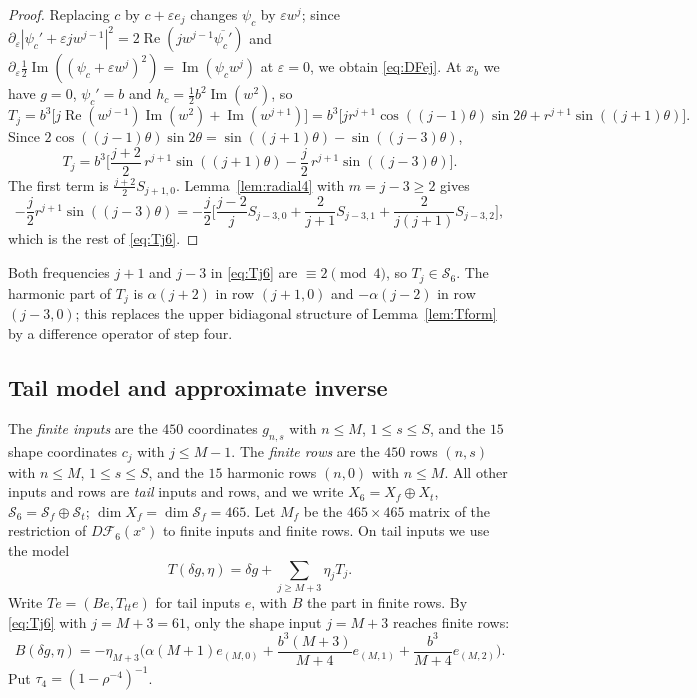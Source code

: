 \documentclass[11pt]{amsart}
\theoremstyle{definition}
\theoremstyle{remark}
\numberwithin{equation}{section}
\newcommand{\Sc}{\mathcal{S}}
\newcommand{\Fc}{\mathcal{F}}
\newcommand{\eps}{\varepsilon}
\DeclareMathOperator{\re}{Re}
\DeclareMathOperator{\im}{Im}
\begin{document}
\begin{proof}
Replacing $c$ by $c+\eps e_j$ changes $\psi_c$ by $\eps w^j$; since $\partial_\eps|\psi_c'+\eps jw^{j-1}|^2=2\re(jw^{j-1}\overline{\psi_c'})$ and $\partial_\eps\frac12\im((\psi_c+\eps w^j)^2)=\im(\psi_cw^j)$ at $\eps=0$, we obtain \eqref{eq:DFej}. At $x_b$ we have $g=0$, $\psi_c'=b$ and $h_c=\frac12b^2\im(w^2)$, so
\[
T_j=b^3\big[j\re(w^{j-1})\im(w^2)+\im(w^{j+1})\big]=b^3\big[jr^{j+1}\cos((j-1)\theta)\sin2\theta+r^{j+1}\sin((j+1)\theta)\big].
\]
Since $2\cos((j-1)\theta)\sin2\theta=\sin((j+1)\theta)-\sin((j-3)\theta)$,
\[
T_j=b^3\Big[\frac{j+2}2\,r^{j+1}\sin((j+1)\theta)-\frac j2\,r^{j+1}\sin((j-3)\theta)\Big].
\]
The first term is $\frac{j+2}2S_{j+1,0}$. Lemma~\ref{lem:radial4} with $m=j-3\geq2$ gives
\[
-\frac j2r^{j+1}\sin((j-3)\theta)=-\frac j2\Big[\frac{j-2}jS_{j-3,0}+\frac2{j+1}S_{j-3,1}+\frac2{j(j+1)}S_{j-3,2}\Big],
\]
which is the rest of \eqref{eq:Tj6}.
\end{proof}

Both frequencies $j+1$ and $j-3$ in \eqref{eq:Tj6} are $\equiv2\pmod4$, so $T_j\in\Sc_6$. The harmonic part of $T_j$ is $\alpha(j+2)$ in row $(j+1,0)$ and $-\alpha(j-2)$ in row $(j-3,0)$; this replaces the upper bidiagonal structure of Lemma~\ref{lem:Tform} by a difference operator of step four.

\subsection{Tail model and approximate inverse}
The \emph{finite inputs} are the $450$ coordinates $g_{n,s}$ with $n\leq M$, $1\leq s\leq S$, and the $15$ shape coordinates $c_j$ with $j\leq M-1$. The \emph{finite rows} are the $450$ rows $(n,s)$ with $n\leq M$, $1\leq s\leq S$, and the $15$ harmonic rows $(n,0)$ with $n\leq M$. All other inputs and rows are \emph{tail} inputs and rows, and we write $X_6=X_f\oplus X_t$, $\Sc_6=\Sc_f\oplus\Sc_t$; $\dim X_f=\dim\Sc_f=465$. Let $M_f$ be the $465\times465$ matrix of the restriction of $D\Fc_6(x^\circ)$ to finite inputs and finite rows. On tail inputs we use the model
\begin{equation}\label{eq:T6}
T(\delta g,\eta)=\delta g+\sum_{j\geq M+3}\eta_jT_j .
\end{equation}
Write $Te=(Be,T_{tt}e)$ for tail inputs $e$, with $B$ the part in finite rows. By \eqref{eq:Tj6} with $j=M+3=61$, only the shape input $j=M+3$ reaches finite rows:
\begin{equation}\label{eq:B6}
B(\delta g,\eta)=-\eta_{M+3}\Big(\alpha(M+1)e_{(M,0)}+\frac{b^3(M+3)}{M+4}e_{(M,1)}+\frac{b^3}{M+4}e_{(M,2)}\Big).
\end{equation}
Put $\tau_4=(1-\rho^{-4})^{-1}$.
\end{document}
